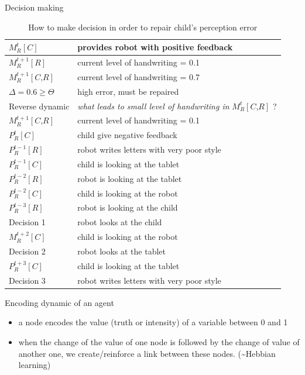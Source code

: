 \documentclass[compress]{beamer}
\begin{document}
\begin{frame}{Decision making}
\begin{table}
\centering
\small
\renewcommand{\arraystretch}{0.9}
\begin{tabular}{|l|l|}
\hline
$M^{t}_R\left[\textit{C}\right]$ & provides robot with positive feedback\\
\hline
$M^{t+1}_R\left[\textit{R}\right]$ & current level of handwriting = 0.1\\
\hline
$M^{t+1}_R\left[\textit{C,R}\right]$ & current level of handwriting = 0.7\\
\hline
$\Delta=0.6 \geq \Theta$ & high error, must be repaired\\
\hline
Reverse dynamic & \textit{what leads to small level of handwriting in} $M^{t}_R\left[\textit{C,R}\right]$ ?\\
\hline
$M^{t+1}_R\left[\textit{C,R}\right]$ & current level of handwriting = 0.1\\
\hline
$P^{t}_R\left[\textit{C}\right]$ & child give negative feedback\\
\hline
$P^{t-1}_R\left[\textit{R}\right]$ & robot writes letters with very poor style\\
\hline
$P^{t-1}_R\left[\textit{C}\right]$ & child is looking at the tablet\\
\hline
$P^{t-2}_R\left[\textit{R}\right]$ & robot is looking at the tablet\\
\hline
$P^{t-2}_R\left[\textit{C}\right]$ & child is looking at the robot\\
\hline
$P^{t-3}_R\left[\textit{R}\right]$ & robot is looking at the child\\
\hline
Decision 1 & robot looks at the child\\
\hline
$M^{t+2}_R\left[\textit{C}\right]$ & child is looking at the robot\\
\hline
Decision 2 & robot looks at the tablet\\
\hline
$P^{t+3}_R\left[\textit{C}\right]$ & child is looking at the tablet\\
\hline
Decision 3 & robot writes letters with very poor style\\
\hline
\end{tabular}
\caption{How to make decision in order to repair child's perception error}
\label{child_err_2}
\end{table}
\end{frame}

\begin{frame}{Encoding dynamic of an agent}
\begin{itemize}
\item a node encodes the value (truth or intensity) of a variable between 0 and 1
\item when the change of the value of one node is followed by the change of value of another one, we create/reinforce a link between these nodes. (\sim Hebbian learning)
\end{itemize}
\end{frame}
\end{document}
